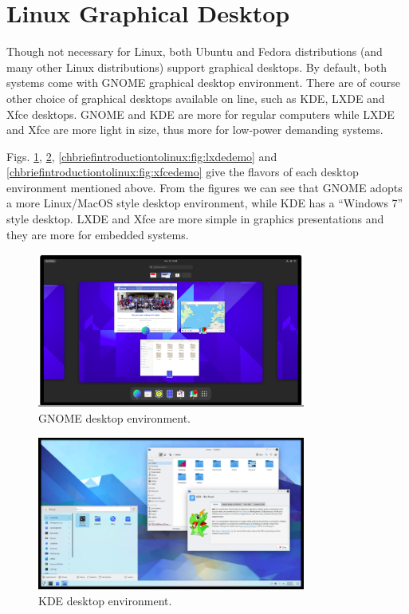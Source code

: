 \section{Linux Graphical Desktop}

Though not necessary for Linux, both Ubuntu and Fedora distributions (and many other Linux distributions) support graphical desktops. By default, both systems come with GNOME graphical desktop environment. There are of course other choice of graphical desktops available on line, such as KDE, LXDE and Xfce desktops. GNOME and KDE are more for regular computers while LXDE and Xfce are more light in size, thus more for low-power demanding systems.

Figs. \ref{chbriefintroductiontolinux:fig:gnomedemo}, \ref{chbriefintroductiontolinux:fig:kdedemo}, \ref{chbriefintroductiontolinux:fig:lxdedemo} and \ref{chbriefintroductiontolinux:fig:xfcedemo} give the flavors of each desktop environment mentioned above. From the figures we can see that GNOME adopts a more Linux/MacOS style desktop environment, while KDE has a ``Windows 7'' style desktop. LXDE and Xfce are more simple in graphics presentations and they are more for embedded systems.

\begin{figure}
	\centering
	\includegraphics[width=250pt]{chapters/ch_brief_introduction_to_linux/figures/gnome_demo.png}
	\caption{GNOME desktop environment.} \label{chbriefintroductiontolinux:fig:gnomedemo}
\end{figure}

\begin{figure}
	\centering
	\includegraphics[width=250pt]{chapters/ch_brief_introduction_to_linux/figures/kde_demo.png}
	\caption{KDE desktop environment.} \label{chbriefintroductiontolinux:fig:kdedemo}
\end{figure}

